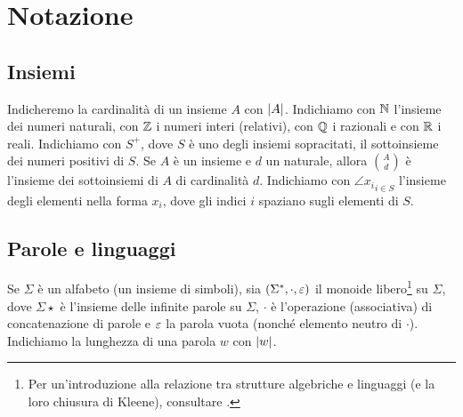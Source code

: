\section*{Notazione}


\subsection*{Insiemi}
Indicheremo la cardinalità di un insieme $A$ con $| A |$.
Indichiamo con $\mathbb N$ l'insieme dei numeri naturali, con $\mathbb Z$ i numeri interi (relativi), con $\mathbb Q$ i razionali e con $\mathbb R$ i reali.
Indichiamo con $S^+$, dove $S$ è uno degli insiemi sopracitati, il sottoinsieme dei numeri positivi di $S$.
Se $A$ è un insieme e $d$ un naturale, allora $\binom{A}{d}$ è l'insieme dei sottoinsiemi di $A$ di cardinalità $d$.
Indichiamo con $\angle{x_i}_{i\in S}$ l'insieme degli elementi nella forma $x_i$, dove gli indici $i$ spaziano sugli elementi di $S$.


\subsection*{Parole e linguaggi}
Se $\Sigma$ è un alfabeto (un insieme di simboli), sia $(\Sigma^*, \cdot, \varepsilon)$ il monoide libero\footnote{Per un'introduzione alla relazione tra strutture algebriche e linguaggi (e la loro	chiusura di Kleene), consultare \cite{Sakarovitch:09:automata}.} su $\Sigma$, dove $\Sigma\star$ è l'insieme delle infinite parole su $\Sigma$, $\cdot$ è l'operazione (associativa) di concatenazione di parole e $\varepsilon$ la parola vuota (nonché elemento neutro di $\cdot$).
Indichiamo la lunghezza di una parola $w$ con $|w|$.


